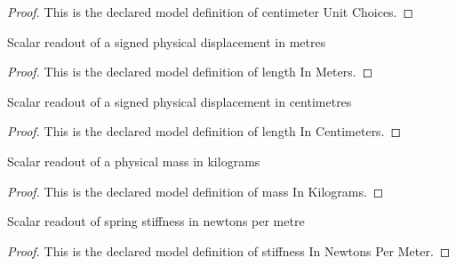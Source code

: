 \begin{proof}
  This is the declared model definition of centimeter Unit Choices.
\end{proof}
\begin{definition}
  \label{def:physics:phyx-mini-0259:phyxminiproblems-problemphyxmini0259-lengthinmeters}
  Scalar readout of a signed physical displacement in metres
\end{definition}
\begin{proof}
  This is the declared model definition of length In Meters.
\end{proof}
\begin{definition}
  \label{def:physics:phyx-mini-0259:phyxminiproblems-problemphyxmini0259-lengthincentimeters}
  Scalar readout of a signed physical displacement in centimetres
\end{definition}
\begin{proof}
  This is the declared model definition of length In Centimeters.
\end{proof}
\begin{definition}
  \label{def:physics:phyx-mini-0259:phyxminiproblems-problemphyxmini0259-massinkilograms}
  Scalar readout of a physical mass in kilograms
\end{definition}
\begin{proof}
  This is the declared model definition of mass In Kilograms.
\end{proof}
\begin{definition}
  \label{def:physics:phyx-mini-0259:phyxminiproblems-problemphyxmini0259-stiffnessinnewtonspermeter}
  Scalar readout of spring stiffness in newtons per metre
\end{definition}
\begin{proof}
  This is the declared model definition of stiffness In Newtons Per Meter.
\end{proof}

